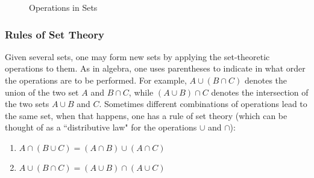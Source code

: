 \begin{figure}[htp]
    \centering
    \begin{subfigure}[b]{0.25\textwidth}
    \centering
    \end{subfigure}
    \begin{subfigure}[b]{0.25\textwidth}
    \centering
    \end{subfigure}
    \begin{subfigure}[b]{0.25\textwidth}
    \centering
    \end{subfigure}
    \caption{Operations in Sets}
    \label{fig:set_operations}
\end{figure}

\subsubsection{Rules of Set Theory}

Given several sets, one may form new sets by applying the set-theoretic operations to them. As in algebra, one uses parentheses to indicate in what order the operations are to be performed. For example, $A \cup (B \cap C)$ denotes the union of the two set $A$ and $B \cap C$, while $(A \cup B) \cap C$ denotes the intersection of the two sets $A \cup B$ and $C$. Sometimes different combinations of operations lead to the same set, when that happens, one has a rule of set theory (which can be thought of as a ``distributive law" for the operations $\cup$ and $\cap$):
\newpage
\begin{enumerate}[itemsep=0pt,topsep=0pt]
    \item $A \cap (B \cup C) = (A \cap B) \cup (A \cap C)$
    \item $A \cup (B \cap C) = (A \cup B) \cap (A \cup C)$
\end{enumerate}

